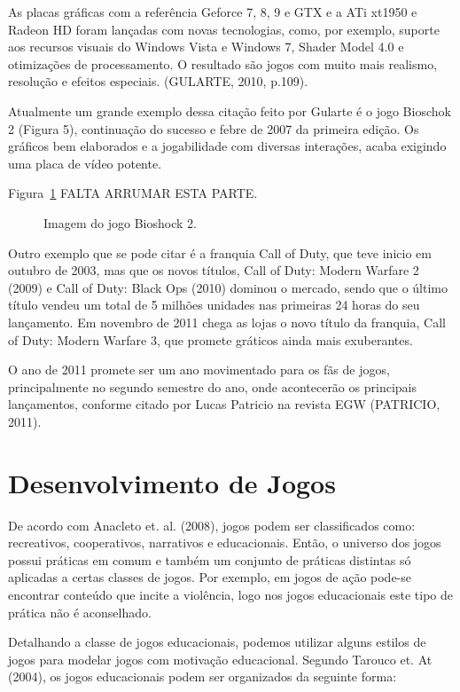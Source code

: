 \begin{citacao}
As placas gráficas com a referência Geforce 7, 8, 9 e GTX e a ATi xt1950 e Radeon HD foram lançadas com novas tecnologias, como, por exemplo, suporte aos recursos visuais do Windows Vista e Windows 7, Shader Model 4.0 e otimizações de processamento. O resultado são jogos com muito mais realismo, resolução e efeitos especiais. (GULARTE, 2010, p.109).
\end{citacao}

Atualmente um grande exemplo dessa citação feito por Gularte é o jogo Bioschok 2 (Figura 5), continuação do sucesso e febre de 2007 da primeira edição. Os gráficos bem elaborados e a jogabilidade com diversas interações, acaba exigindo uma placa de vídeo potente.

Figura~\ref{f1.5} FALTA ARRUMAR ESTA PARTE.
\begin{figure}[!hbp]
\makebox[\textwidth]{\framebox[5cm]{\rule{0pt}{5cm}}}
\caption{Imagem do jogo Bioshock 2.} \label{f1.5}
\end{figure}

Outro exemplo que se pode citar é a franquia Call of Duty, que teve inicio em outubro de 2003, mas que os novos títulos, Call of Duty: Modern Warfare 2 (2009) e Call of Duty: Black Ops (2010) dominou o mercado, sendo que o último título vendeu um total de 5 milhões unidades nas primeiras 24 horas do seu lançamento. Em novembro de 2011 chega as lojas o novo título da franquia, Call of Duty: Modern Warfare 3, que promete gráticos ainda mais exuberantes. 

O ano de 2011 promete ser um ano movimentado para os fãs de jogos, principalmente no segundo semestre do ano, onde acontecerão os principais lançamentos, conforme citado por Lucas Patricio na revista EGW (PATRICIO, 2011). 

\section{Desenvolvimento de Jogos}

De acordo com Anacleto et. al. (2008), jogos podem ser classificados como: recreativos, cooperativos, narrativos e educacionais. Então, o universo dos jogos possui práticas em comum e também um conjunto de práticas distintas só aplicadas a certas classes de jogos. Por exemplo, em jogos de ação pode-se encontrar conteúdo que incite a violência, logo nos jogos educacionais este tipo de prática não é aconselhado.

Detalhando a classe de jogos educacionais, podemos utilizar alguns estilos de jogos para modelar jogos com motivação educacional. Segundo Tarouco et. At (2004), os jogos educacionais podem ser organizados da seguinte forma: 


